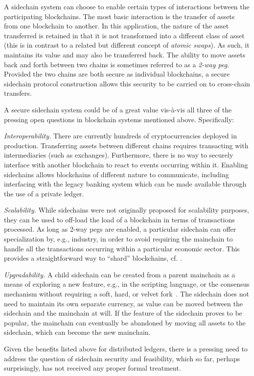A sidechain system can choose to enable certain types of interactions between
the participating block\-chains. The most basic interaction
is the transfer of assets from
one blockchain to another. In this application, the nature of the asset
transferred is retained in that it is not transformed into a different class of
asset (this is in contrast to a related but different concept of \emph{atomic
swaps}).
As such, it maintains its value and may also be transferred back.
The ability to move assets back and
forth between two chains is sometimes referred to as a \textit{2-way peg}. Provided
the two chains are both secure as individual blockchains, a secure
sidechain protocol construction allows this security to be carried on to
cross-chain transfers.

A secure sidechain system could be of a great value vis-\`a-vis all three
of the pressing open questions in blockchain systems mentioned above. Specifically:

{\em Interoperability.} There are currently hundreds of
    cryptocurrencies deployed in production. Transferring assets between
    different chains requires transacting with intermediaries (such as exchanges). Furthermore,
    there is no way to securely interface with another blockchain to react to
    events occurring within it. Enabling sidechains allows
    blockchains of different nature to communicate, including interfacing with
    the legacy banking system which can be made available through the use of
    a private ledger.

{\em   Scalability.} While sidechains were not originally proposed for
    scalability purposes, they can be used to off-load the load of a blockchain
    in terms of transactions processed. As long as 2-way pegs are enabled, a
    particular sidechain can offer specialization by, e.g., industry, in order
    to avoid requiring the mainchain to handle all the transactions occurring
    within a particular economic sector. This provides a straightforward way to
    ``shard'' blockchains, cf. \cite{sharding,omniledger,rapidchain}.

{\em Upgradability.} A child sidechain can be created from a parent
    mainchain as a means of exploring a new feature, e.g., in the scripting language, or
    the consensus mechanism
    without requiring a soft, hard, or velvet fork~\cite{nipopows,velvet}. The
    sidechain does not need to maintain its own separate currency, as value can
    be moved between the sidechain and the mainchain at will. If the feature of
    the sidechain proves to be popular, the mainchain can eventually be
    abandoned by moving all assets to the sidechain, which can become the new
    mainchain.

Given the benefits listed above for distributed ledgers, there is a pressing
need to address the question of sidechain security and feasibility, which so far, perhaps surprisingly, has not received any proper formal treatment.
